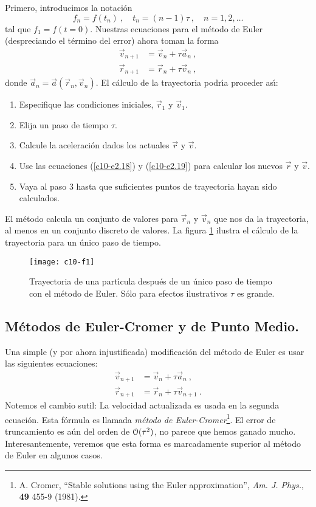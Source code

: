 Primero, introducimos la notaci{\'o}n
\begin{equation}
\label{c10-e2.17}
  f_n=f(t_n)\ , \quad t_n=(n-1)\tau\ , \quad n=1,2,\ldots
\end{equation}
tal que $f_1=f(t=0)$. Nuestras ecuaciones para el m{\'e}todo de Euler
(despreciando el t{\'e}rmino del error) ahora toman la forma
\begin{align}
\label{c10-e2.18}
\vec v_{n+1}  &= \vec v_n + \tau \vec a_n\ ,\\
\label{c10-e2.19}
\vec r_{n+1}  &= \vec r_n + \tau \vec v_n\ ,
\end{align}
donde $\vec a_n= \vec a(\vec r_n,\vec v_n)$. El c{\'a}lculo de la
trayectoria podr{\'\i}a proceder as{\'\i}:
\begin{enumerate}
\item Especifique las condiciones iniciales, $\vec r_1$ y $\vec v_1$.
\item Elija un paso de tiempo $\tau$.
\item Calcule la aceleraci{\'o}n dados los actuales $\vec r$ y $\vec v$.
\item Use las ecuaciones (\ref{c10-e2.18}) y (\ref{c10-e2.19}) para
  calcular los nuevos $\vec r$ y $\vec v$.
\item Vaya al paso 3 hasta que suficientes puntos de trayectoria hayan
  sido calculados.
\end{enumerate}
El m{\'e}todo calcula un conjunto de valores para $\vec r_n$ y $\vec v_n$
que nos da la trayectoria, al menos en un conjunto discreto de
valores. La figura \ref{c10-f1} ilustra el c{\'a}lculo de la trayectoria
para un {\'u}nico paso de tiempo.

\begin{figure}
\begin{center}
\texttt{[image: c10-f1]}
\caption{Trayectoria de una part{\'\i}cula despu{\'e}s de un {\'u}nico paso de
  tiempo con el m{\'e}todo de Euler. S{\'o}lo para efectos ilustrativos $\tau$ es
  grande.}\label{c10-f1}
\end{center}
\end{figure}

\subsection{M{\'e}todos de Euler-Cromer y de Punto Medio.}

Una simple (y por ahora injustificada) modificaci{\'o}n del m{\'e}todo de
Euler es usar las siguientes ecuaciones:
\begin{align}
\label{c10-e2.20}
\vec v_{n+1}  &= \vec v_n + \tau \vec a_n\ ,\\
\label{c10-e2.21}
\vec r_{n+1}  &= \vec r_n + \tau \vec v_{n+1}\ .
\end{align}
Notemos el cambio sutil: La velocidad actualizada es usada en la
segunda ecuaci{\'o}n. Esta f{\'o}rmula es llamada {\em m{\'e}todo de
  Euler-Cromer}\footnote{A. Cromer, ``Stable solutions using the
  Euler approximation'', {\em Am. J. Phys.}, {\bf 49} 455-9 (1981).}.
El error de truncamiento es a{\'u}n del orden de $\EuScript{O}(\tau^2)$, no
parece que hemos ganado mucho. Interesantemente, veremos que esta
forma es marcadamente superior al m{\'e}todo de Euler en algunos casos. 

